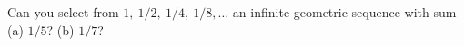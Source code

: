 Can you select from $1,\ 1/2,\ 1/4,\ 1/8, \ldots$ an infinite geometric sequence with sum (a) $1/5$? (b) $1/7$?
